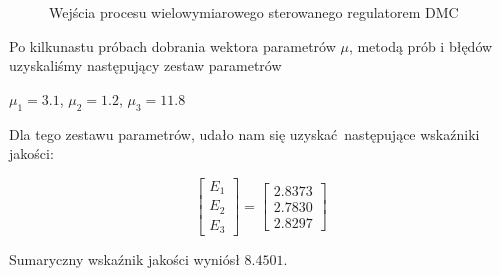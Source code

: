 \begin{figure}
    \begin{subfigure}[b]{\textwidth}
        \centering
    \end{subfigure}
    \caption{Wejścia procesu wielowymiarowego sterowanego regulatorem DMC}
    \label{pro_dmc_2_in}
\end{figure}
\FloatBarrier

Po kilkunastu próbach dobrania wektora parametrów $\mu$, metodą prób i błędów uzyskaliśmy następujący zestaw parametrów

\begin{center}
    $\mu_{1} = \num{3.1}$, $\mu_{2} = \num{1.2}$, $\mu_{3} = \num{11.8}$
\end{center}

Dla tego zestawu parametrów, udało nam się uzyskać następujące wskaźniki jakości:


\[
\begin{bmatrix}
    E_{\mathrm{1}} \\
    E_{\mathrm{2}} \\
    E_{\mathrm{3}} 
\end{bmatrix}
= 
\begin{bmatrix}
    \num{2.8373} \\
    \num{2.7830} \\
    \num{2.8297}
\end{bmatrix}
\]

Sumaryczny wskaźnik jakości wyniósł $\num{8.4501}$.\\


